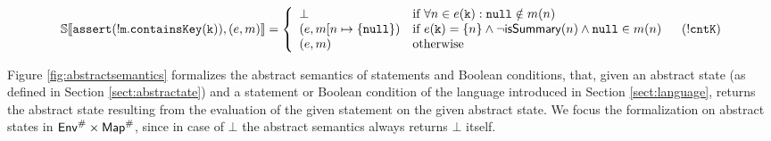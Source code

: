 \begin{figure*}
\[\begin{array}{ll}
\\
\mathbb{S}\llbracket \mathtt{assert(!m.containsKey(k))}, (e, m) \rrbracket = \left\{
\begin{array}{ll}
\bot & \textrm{if } \forall n \in e(\mathtt{k}) : \mathtt{null} \notin m(n)\\
(e, m[n \mapsto \{\mathtt{null}\}) & \textrm{if } e(\mathtt{k}) = \{n\} \land \neg \mathsf{isSummary}(n) \land \mathtt{null} \in m(n)\\
(e, m) & \textrm{otherwise}\\
\end{array}
\right. & (\mathtt{!cntK})\\
\end{array}
\]
\caption{Formal definition of the abstract semantics}
\label{fig:abstractsemantics}
\end{figure*}
Figure \ref{fig:abstractsemantics} formalizes the abstract semantics of statements and Boolean conditions, that, given an abstract state (as defined in Section \ref{sect:abstractate}) and a statement or Boolean condition of the language introduced in Section \ref{sect:language}, returns the abstract state resulting from the evaluation of the given statement on the given abstract state. We focus the formalization on abstract states in $\mathsf{Env}^\# \times \mathsf{Map}^\#$, since in case of $\bot$ the abstract semantics always returns $\bot$ itself.

